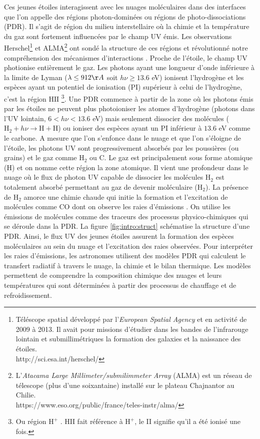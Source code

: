 \documentclass[11pt,a4paper,twoside,openright]{article}
\begin{document}
\begin{spacing}{0.98}
Ces jeunes étoiles interagissent avec les nuages moléculaires dans des interfaces que l'on appelle des régions photon-dominées ou régions de photo-dissociations (PDR). Il s'agit de région du milieu interstellaire où la chimie et la température du gaz sont fortement influencées par le champ UV émis. Les observations Herschel\footnote{Téléscope spatial développé par l'\textit{European Spatial Agency} et en activité de 2009 à 2013. Il avait pour missions d'étudier dans les bandes de l'infrarouge lointain et submillimétriques la formation des galaxies et la naissance des étoiles. \\ 
 http://sci.esa.int/herschel/} et ALMA\footnote{
L'\textit{Atacama Large Millimeter/submilimmeter Array} (ALMA) est un réseau de télescope (plus d'une soixantaine) installé sur le plateau Chajnantor au Chilie. \\
 https://www.eso.org/public/france/teles-instr/alma/} ont sondé la structure de ces régions et révolutionné notre compréhension des mécanismes d'interactions \cite{Goicoechea2016, COJoblin}.
Proche de l'étoile, le champ UV photionise entièrement le gaz. Les photons ayant une longueur d'onde inférieure à la limite de Lyman ($\lambda \leq 912 \AA$ soit $h\nu \geq 13.6$ eV) ionisent l'hydrogène et les espèces ayant un potentiel de ionisation (PI) supérieur à celui de l'hydrogène, c'est la \og région $\mathrm{HII}$ \fg{} \footnote{Ou \og région $\mathrm{H}^+$ \fg{}. $\mathrm{HII}$ fait référence à $\mathrm{H}^+$, le II signifie qu'il a été ionisé une fois.}. Une PDR commence à partir de la zone où les photons émis par les étoiles ne peuvent plus photoioniser les atomes d'hydrogène (photons dans l'UV lointain, $6<h\nu<13.6$ eV) mais seulement dissocier des molécules ($\mathrm{H}_2 + h\nu \rightarrow \mathrm{H}+\mathrm{H}$) ou ioniser des espèces ayant un PI inférieur à $13.6$ eV comme le carbone. A mesure que l'on s'enfonce dans le nuage et que l'on s'éloigne de l'étoile, les photons UV sont progressivement absorbés par les poussières (ou grains) et le gaz comme $\mathrm{H}_2$ ou $\mathrm{C}$.
Le gaz est principalement sous forme atomique ($\mathrm{H}$) et on nomme cette région la zone atomique. Il vient une profondeur dans le nuage où le flux de photon UV capable de dissocier les molécules $\mathrm{H}_2$ est totalement absorbé permettant au gaz de devenir moléculaire ($\mathrm{H}_2$). La présence de $\mathrm{H}_2$ amorce une chimie chaude qui initie la formation et l'excitation de molécules comme $\mathrm{CO}$ dont on observe les raies d'émissions \cite{COJoblin}. On utilise les émissions de molécules comme des traceurs des processus physico-chimiques qui se déroule dans la PDR. La figure \ref{fig:intro:struct} schématise la structure d'une PDR. Ainsi, le flux UV des jeunes étoiles assurent la formation des espèces moléculaires au sein du nuage et l'excitation des raies observées. Pour interpréter les raies d'émissions, les astronomes utilisent des modèles PDR qui calculent le transfert radiatif à travers le nuage, la chimie et le bilan thermique. Les modèles permettent de comprendre la composition chimique des nuages et leurs températures qui sont déterminées à partir des processus de chauffage et de refroidissement. \newline 


\end{spacing}
\end{document}
